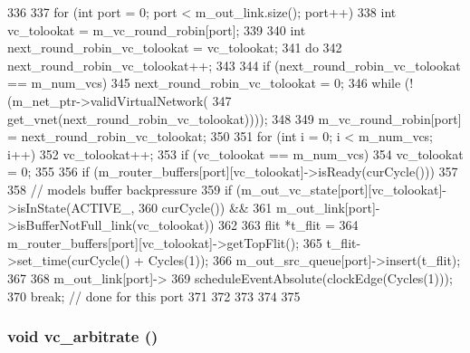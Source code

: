 \begin{DoxyCode}
336 {
337     for (int port = 0; port < m_out_link.size(); port++) {
338         int vc_tolookat = m_vc_round_robin[port];
339 
340         int next_round_robin_vc_tolookat = vc_tolookat;
341         do {
342             next_round_robin_vc_tolookat++;
343 
344             if (next_round_robin_vc_tolookat == m_num_vcs)
345                 next_round_robin_vc_tolookat = 0;
346         } while (!(m_net_ptr->validVirtualNetwork(
347                    get_vnet(next_round_robin_vc_tolookat))));
348 
349         m_vc_round_robin[port] = next_round_robin_vc_tolookat;
350 
351         for (int i = 0; i < m_num_vcs; i++) {
352             vc_tolookat++;
353             if (vc_tolookat == m_num_vcs)
354                 vc_tolookat = 0;
355 
356             if (m_router_buffers[port][vc_tolookat]->isReady(curCycle())) {
357 
358                 // models buffer backpressure
359                 if (m_out_vc_state[port][vc_tolookat]->isInState(ACTIVE_,
360                    curCycle()) &&
361                    m_out_link[port]->isBufferNotFull_link(vc_tolookat)) {
362 
363                     flit *t_flit =
364                         m_router_buffers[port][vc_tolookat]->getTopFlit();
365                     t_flit->set_time(curCycle() + Cycles(1));
366                     m_out_src_queue[port]->insert(t_flit);
367 
368                     m_out_link[port]->
369                         scheduleEventAbsolute(clockEdge(Cycles(1)));
370                     break; // done for this port
371                 }
372             }
373         }
374     }
375 }
\end{DoxyCode}
\hypertarget{classRouter_a3e82da716c2557efa2e6a293843b4d0a}{
\subsubsection[{vc\_\-arbitrate}]{\setlength{\rightskip}{0pt plus 5cm}void vc\_\-arbitrate ()}}
\label{classRouter_a3e82da716c2557efa2e6a293843b4d0a}



